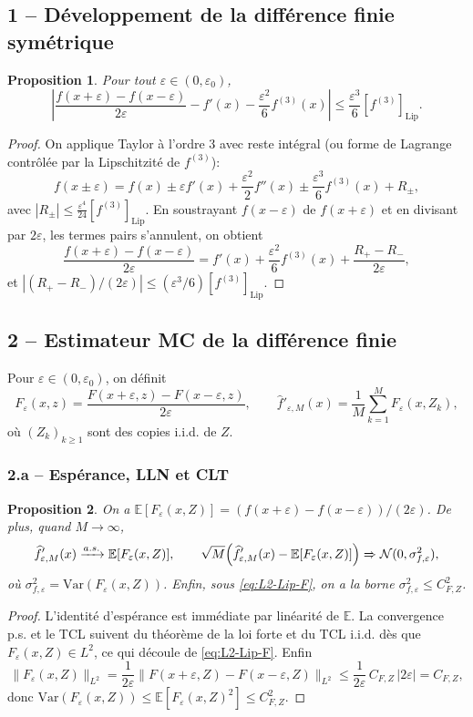 \documentclass[11pt,a4paper]{article}
\newcommand{\E}{\mathbb{E}}
\newcommand{\1}{\mathbbm{1}}
\newcommand{\Lip}{\mathrm{Lip}}
\newcommand{\Var}{\mathrm{Var}}
\theoremstyle{plain}
\newtheorem{proposition}{Proposition}
\theoremstyle{definition}
\begin{document}
\subsection{1 -- Développement de la différence finie symétrique}
\begin{proposition}\label{prop:df-sym-ordre2}
Pour tout $\varepsilon\in(0,\varepsilon_0)$,
\[
\left|\frac{f(x+\varepsilon)-f(x-\varepsilon)}{2\varepsilon}-f'(x)-\frac{\varepsilon^2}{6}f^{(3)}(x)\right|
\le \frac{\varepsilon^3}{6}[f^{(3)}]_{\Lip}.
\]
\end{proposition}
\begin{proof}
On applique Taylor à l'ordre 3 avec reste intégral (ou forme de Lagrange contrôlée par la Lipschitzité de $f^{(3)}$):
\[
f(x\pm\varepsilon)
=f(x)\pm \varepsilon f'(x)+\frac{\varepsilon^2}{2}f''(x)\pm \frac{\varepsilon^3}{6}f^{(3)}(x)+R_\pm,
\]
avec $|R_\pm|\le \frac{\varepsilon^4}{24}[f^{(3)}]_{\Lip}$.
En soustrayant $f(x-\varepsilon)$ de $f(x+\varepsilon)$ et en divisant par $2\varepsilon$, les termes pairs s'annulent, on obtient
\[
\frac{f(x+\varepsilon)-f(x-\varepsilon)}{2\varepsilon}
=f'(x)+\frac{\varepsilon^2}{6}f^{(3)}(x)+\frac{R_+-R_-}{2\varepsilon},
\]
et $|(R_+-R_-)/(2\varepsilon)|\le (\varepsilon^3/6)[f^{(3)}]_{\Lip}$.
\end{proof}

\subsection{2 -- Estimateur MC de la différence finie}
Pour $\varepsilon\in(0,\varepsilon_0)$, on définit
\[
F_\varepsilon(x,z)=\frac{F(x+\varepsilon,z)-F(x-\varepsilon,z)}{2\varepsilon},
\qquad
\widehat f'_{\varepsilon,M}(x)=\frac1M\sum_{k=1}^M F_\varepsilon(x,Z_k),
\]
où $(Z_k)_{k\ge1}$ sont des copies i.i.d. de $Z$.

\subsubsection{2.a -- Espérance, LLN et CLT}
\begin{proposition}
On a $\E[F_\varepsilon(x,Z)]=(f(x+\varepsilon)-f(x-\varepsilon))/(2\varepsilon)$.
De plus, quand $M\to\infty$,
\[
\widehat f'_{\varepsilon,M}(x)\xrightarrow[]{a.s.}\E[F_\varepsilon(x,Z)],
\qquad
\sqrt{M}\Big(\widehat f'_{\varepsilon,M}(x)-\E[F_\varepsilon(x,Z)]\Big)\xRightarrow[]{}
\mathcal N(0,\sigma_{f,\varepsilon}^2),
\]
où $\sigma_{f,\varepsilon}^2=\Var(F_\varepsilon(x,Z))$.
Enfin, sous \eqref{eq:L2-Lip-F}, on a la borne $\sigma_{f,\varepsilon}^2\le C_{F,Z}^2$.
\end{proposition}
\begin{proof}
L'identité d'espérance est immédiate par linéarité de $\E$.
La convergence p.s. et le TCL suivent du théorème de la loi forte et du TCL i.i.d. dès que $F_\varepsilon(x,Z)\in L^2$, ce qui découle de \eqref{eq:L2-Lip-F}.
Enfin
\[
\|F_\varepsilon(x,Z)\|_{L^2}
=\frac{1}{2\varepsilon}\|F(x+\varepsilon,Z)-F(x-\varepsilon,Z)\|_{L^2}
\le \frac{1}{2\varepsilon}\,C_{F,Z}\,|2\varepsilon|=C_{F,Z},
\]
donc $\Var(F_\varepsilon(x,Z))\le \E[F_\varepsilon(x,Z)^2]\le C_{F,Z}^2$.
\end{proof}
\end{document}
